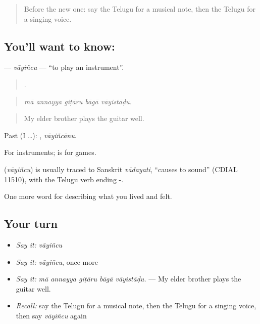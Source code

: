 \label{lesson:TE-C538-vayincu}



\begin{quote}
Before the new one: say the Telugu for a musical note, then the Telugu for a singing voice.
\end{quote}

\subsection*{You'll want to know: }
\textbf{} — \emph{vāyiñcu} — \textquotedblleft{}to play an instrument\textquotedblright{}.

\begin{quote}
    .
\end{quote}

\begin{quote}
\emph{mā annayya giṭāru bāgā vāyistāḍu.}
\end{quote}

\begin{quote}
My elder brother plays the guitar well.
\end{quote}

Past (I …): , \emph{vāyiñcānu}.

For instruments;  is for games.

\begin{cousinweb}
\textbf{} (\emph{vāyiñcu}) is usually traced to Sanskrit \emph{vādayati}, \textquotedblleft{}causes to sound\textquotedblright{} (CDIAL 11510), with the Telugu verb ending -.
\end{cousinweb}

\begin{grammarlens}[title={What you've built}]
One more word for describing what you lived and felt.
\end{grammarlens}

\subsection*{Your turn}
\begin{itemize}
\raggedright
  \item \emph{Say it:} \emph{vāyiñcu}
  \item \emph{Say it:} \emph{vāyiñcu}, once more
  \item \emph{Say it:} \emph{mā annayya giṭāru bāgā vāyistāḍu.} — My elder brother plays the guitar well.
  \item \emph{Recall:} say the Telugu for a musical note, then the Telugu for a singing voice, then say \emph{vāyiñcu} again
\end{itemize}

